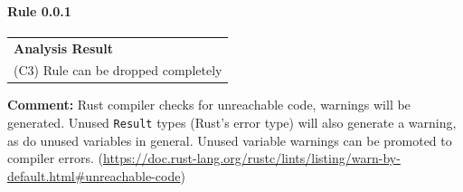 \paragraph{Rule 0.0.1}
\begin{longtable}{p{13cm}}
\textbf{Analysis Result} \\
(C3) Rule can be dropped completely \\
\end{longtable}
\textbf{Comment:} Rust compiler checks for unreachable code, warnings will be generated. Unused \texttt{Result} types (Rust's error type) will also generate a warning, as do unused variables in general. Unused variable warnings can be promoted to compiler errors. (\url{https://doc.rust-lang.org/rustc/lints/listing/warn-by-default.html#unreachable-code}) \\


